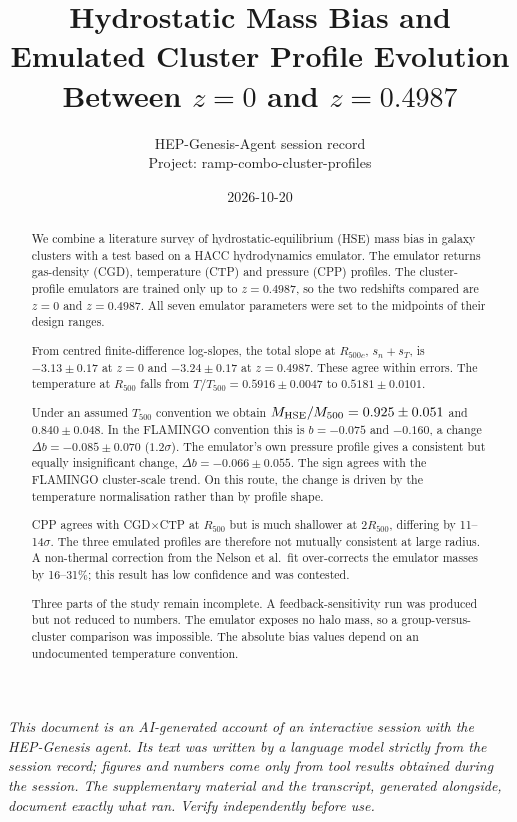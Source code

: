 \documentclass[11pt,a4paper]{article}
\title{Hydrostatic Mass Bias and Emulated Cluster Profile Evolution Between $z=0$ and $z=0.4987$}
\author{HEP-Genesis-Agent session record \\ \small Project: ramp-combo-cluster-profiles}
\date{2026-10-20}
\begin{document}
\maketitle
\noindent\textit{\small This document is an AI-generated account of an interactive session with the HEP-Genesis agent. Its text was written by a language model strictly from the session record; figures and numbers come only from tool results obtained during the session. The supplementary material and the transcript, generated alongside, document exactly what ran. Verify independently before use.}
\vspace{1em}

\begin{abstract}
We combine a literature survey of hydrostatic-equilibrium (HSE) mass bias in galaxy clusters with a test based on a HACC hydrodynamics emulator. The emulator returns gas-density (CGD), temperature (CTP) and pressure (CPP) profiles. The cluster-profile emulators are trained only up to $z=0.4987$, so the two redshifts compared are $z=0$ and $z=0.4987$. All seven emulator parameters were set to the midpoints of their design ranges.

From centred finite-difference log-slopes, the total slope at $R_{500c}$, $s_n+s_T$, is $-3.13\pm0.17$ at $z=0$ and $-3.24\pm0.17$ at $z=0.4987$. These agree within errors. The temperature at $R_{500}$ falls from $T/T_{500}=0.5916\pm0.0047$ to $0.5181\pm0.0101$.

Under an assumed $T_{500}$ convention we obtain $M_{\rm HSE}/M_{500}=0.925\pm0.051$ and $0.840\pm0.048$. In the FLAMINGO convention this is $b=-0.075$ and $-0.160$, a change $\Delta b=-0.085\pm0.070$ ($1.2\sigma$). The emulator's own pressure profile gives a consistent but equally insignificant change, $\Delta b=-0.066\pm0.055$. The sign agrees with the FLAMINGO cluster-scale trend. On this route, the change is driven by the temperature normalisation rather than by profile shape.

CPP agrees with CGD$\times$CTP at $R_{500}$ but is much shallower at $2R_{500}$, differing by 11--14$\sigma$. The three emulated profiles are therefore not mutually consistent at large radius. A non-thermal correction from the Nelson et al.\ fit over-corrects the emulator masses by 16--31\%; this result has low confidence and was contested.

Three parts of the study remain incomplete. A feedback-sensitivity run was produced but not reduced to numbers. The emulator exposes no halo mass, so a group-versus-cluster comparison was impossible. The absolute bias values depend on an undocumented temperature convention.
\end{abstract}
\end{document}
